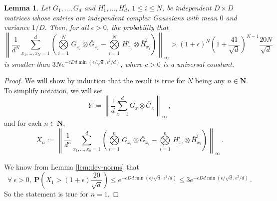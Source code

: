 \documentclass{amsart}
\newtheorem{lemma}[theorem]{Lemma}
\newcommand{\N}{\mathbf{N}}
\renewcommand{\P}{\mathbf{P}}
\renewcommand{\leq}{\leqslant}
\begin{document}
\begin{lemma} \label{lem:dev-norm-sym-n}
    Let $G_1,\ldots,G_d$ and $H_1^i,\ldots,H_d^i$, $1\leq i\leq N$, be independent $D\times D$ matrices whose entries are independent complex Gaussians with mean $0$ and variance $1/D$. Then, for all $\epsilon>0$, the probability that
    \[ \left\| \frac{1}{d^N}\sum_{x_1,\ldots,x_N=1}^d \left( \underset{i=1}{\overset{N}{\bigotimes}}\, G_{x_i}\otimes\bar{G}_{x_i} - \underset{i=1}{\overset{N}{\bigotimes}}\, H_{x_i}^i\otimes\bar{H}_{x_i}^i \right) \right\|_{\infty} > (1+\epsilon)^N \left(1+\frac{41}{\sqrt{d}}\right)^{N-1}\frac{20N}{\sqrt{d}} \]
    is smaller than $3Ne^{-cDd\min(\epsilon/\sqrt{d},\epsilon^2/d)}$, where $c>0$ is a universal constant.
\end{lemma}

\begin{proof}
    We will show by induction that the result is true for $N$ being any $n\in\N$. To simplify notation, we will set
    \[ Y := \left\| \frac{1}{d}\sum_{x=1}^d G_x\otimes \bar{G}_x \right\|_{\infty} \, ,  \]
    and for each $n\in\N$,
    \[ X_n := \left\| \frac{1}{d^n}\sum_{x_1,\ldots,x_n=1}^d \left( \underset{i=1}{\overset{n}{\bigotimes}}\, G_{x_i}\otimes\bar{G}_{x_i} - \underset{i=1}{\overset{n}{\bigotimes}}\, H_{x_i}^i\otimes\bar{H}_{x_i}^i \right) \right\|_{\infty} \, . \]

    We know from Lemma \ref{lem:dev-norms} that
    \[ \forall\ \epsilon>0,\ \P \left( X_1 > (1+\epsilon)\frac{20}{\sqrt{d}} \right) \leq e^{-cDd\min(\epsilon/\sqrt{d},\epsilon^2/d)} \leq 3e^{-cDd\min(\epsilon/\sqrt{d},\epsilon^2/d)} \, . \]
    So the statement is true for $n=1$.


\end{proof}
\end{document}
